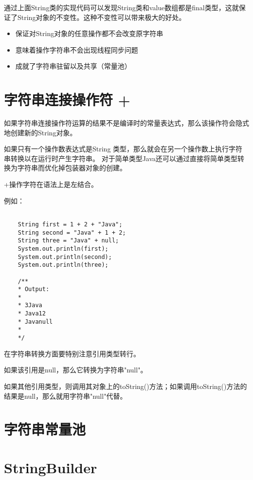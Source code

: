 通过上面String类的实现代码可以发现String类和value数组都是final类型，这就保证了String对象的不变性。这种不变性可以带来极大的好处。

\begin{itemize}
    \item 保证对String对象的任意操作都不会改变原字符串
    \item 意味着操作字符串不会出现线程同步问题
    \item 成就了字符串驻留以及共享（常量池）
\end{itemize}



\section{字符串连接操作符 + }


如果字符串连接操作符运算的结果不是编译时的常量表达式，那么该操作符会隐式地创建新的String对象。


如果只有一个操作数表达式是String 类型，那么就会在另一个操作数上执行字符串转换以在运行时产生字符串。 
对于简单类型Java还可以通过直接将简单类型转换为字符串而优化掉包装器对象的创建。

\textcolor{codepurple}{+}操作字符在语法上是左结合。

例如：

\begin{lstlisting}[style=cjava]

    String first = 1 + 2 + "Java";
    String second = "Java" + 1 + 2;
    String three = "Java" + null;
    System.out.println(first);
    System.out.println(second);
    System.out.println(three);

    /** 
    * Output: 
    * 
    * 3Java
    * Java12
    * Javanull
    * 
    */

\end{lstlisting}


在字符串转换方面要特别注意引用类型转行。

如果该引用是null，那么它转换为字符串"null"。

如果其他引用类型，则调用其对象上的toString()方法；如果调用toString()方法的结果是null，那么就用字符串"null"代替。


\section{字符串常量池}




\section{StringBuilder}









